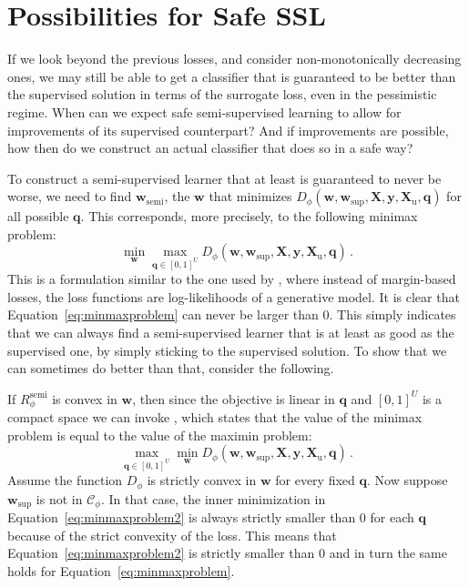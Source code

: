 \documentclass[twoside]{memoir}\usepackage[]{graphicx}\usepackage{xcolor}
\begin{document}
\section{Possibilities for Safe SSL}
If we look beyond the previous losses, and consider non-monotonically decreasing ones, we may still be able to get a classifier that is guaranteed to be better than the supervised solution in terms of the surrogate loss, even in the pessimistic regime.
When can we expect safe semi-supervised learning to allow for improvements of its supervised counterpart?
And if improvements are possible, how then do we construct an actual classifier that does so in a safe way?

To construct a semi-supervised learner that at least is guaranteed to never be worse, we need to find $\mathbf{w}_\mathrm{semi}$, the $\mathbf{w}$ that minimizes $ {D}_\phi(\mathbf{w},\mathbf{w}_\mathrm{sup},\mathbf{X},\mathbf{y},\mathbf{X}_\mathrm{u},\mathbf{q})$ for all possible $\mathbf{q}$.  This corresponds, more precisely, to the following minimax problem:
\begin{equation} \label{eq:minmaxproblem}
\min_{\mathbf{w}} \max_{\mathbf{q} \in [0,1]^U} {D}_\phi(\mathbf{w},\mathbf{w}_\mathrm{sup},\mathbf{X},\mathbf{y},\mathbf{X}_\mathrm{u},\mathbf{q}) \, .
\end{equation}
This is a formulation similar to the one used by \citet{Loog2016}, where instead of margin-based losses, the loss functions are log-likelihoods of a generative model. It is clear that Equation~\eqref{eq:minmaxproblem} can never be larger than 0.  This simply indicates that we can always find a semi-supervised learner that is at least as good as the supervised one, by simply sticking to the supervised solution. To show that we can sometimes do better than that, consider the following.

If ${R}_\phi^\mathrm{semi}$ is convex in $\mathbf{w}$, then since the objective is linear in $\mathbf{q}$ and $[0,1]^U$ is a compact space we can invoke \citep[Corrolary 3.3]{Sion1958}, which states that the value of the minimax problem is equal to the value of the maximin problem:
\begin{equation} \label{eq:minmaxproblem2}
 \max_{\mathbf{q} \in [0,1]^U} \min_{\mathbf{w}} {D}_\phi(\mathbf{w},\mathbf{w}_\mathrm{sup},\mathbf{X},\mathbf{y},\mathbf{X}_\mathrm{u},\mathbf{q}) \, .
\end{equation}
Assume the function ${D}_\phi$ is strictly convex in $\mathbf{w}$ for every fixed $\mathbf{q}$. Now suppose $\mathbf{w}_\mathrm{sup}$ is not in $\mathcal{C}_\phi$. In that case, the inner minimization in Equation~\eqref{eq:minmaxproblem2} is always strictly smaller than $0$ for each $\mathbf{q}$ because of the strict convexity of the loss. This means that  Equation~\eqref{eq:minmaxproblem2} is strictly smaller than $0$ and in turn the same holds for Equation~\eqref{eq:minmaxproblem}. 
\end{document}
